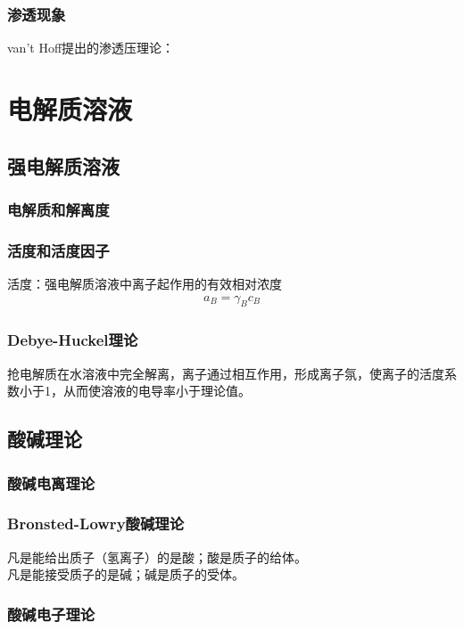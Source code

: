 \documentclass[12pt, a4paper, oneside]{ctexbook}
\begin{document}
\subsection{渗透现象}
van't Hoff提出的渗透压理论：

\chapter{电解质溶液}
\section{强电解质溶液}
\subsection{电解质和解离度}

\subsection{活度和活度因子}
活度：强电解质溶液中离子起作用的有效相对浓度
\begin{align*}
    a_B = \gamma_B c_B
\end{align*}

\subsection{Debye-Huckel理论}
抢电解质在水溶液中完全解离，离子通过相互作用，形成离子氛，使离子的活度系数小于1，从而使溶液的电导率小于理论值。

\section{酸碱理论}
\subsection{酸碱电离理论}
\subsection{Bronsted-Lowry酸碱理论}
凡是能给出质子（氢离子）的是酸；酸是质子的给体。\\
凡是能接受质子的是碱；碱是质子的受体。
\subsection{酸碱电子理论}
\end{document}
